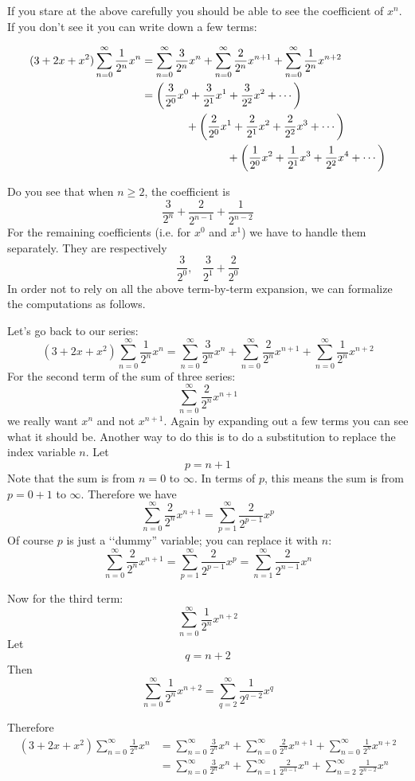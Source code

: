 If you stare at the above carefully you should be able to
see the coefficient of $x^n$.
If you don't see it you can write down a few terms:

\begin{align*}
(3 + 2x + x^2) \sum_{n = 0}^\infty \frac{1}{2^n}x^n
&= \sum_{n = 0}^\infty \frac{3}{2^n}x^n
+ \sum_{n = 0}^\infty \frac{2}{2^n}x^{n+1}
+ \sum_{n = 0}^\infty \frac{1}{2^n}x^{n+2} \\
&=
\biggl( \frac{3}{2^0}x^0 + \frac{3}{2^1}x^1 + \frac{3}{2^2}x^2 + \cdots \biggr) \\ 
&\hskip 1.4cm + \biggl( \frac{2}{2^0}x^1 + \frac{2}{2^1}x^2 + \frac{2}{2^2}x^3 + \cdots \biggr) \\
&\hskip 2.7cm + \biggl( \frac{1}{2^0}x^2 + \frac{1}{2^1}x^3 + \frac{1}{2^2}x^4 + \cdots \biggr)
\end{align*}

Do you see that when $n \geq 2$, the coefficient is
\[
\frac{3}{2^n} + \frac{2}{2^{n-1}} + \frac{1}{2^{n-2}}
\]
For the remaining coefficients (i.e. for $x^0$ and $x^1$) we have to 
handle them separately. They are respectively
\[
\frac{3}{2^0}, \,\,\,\,\, \frac{3}{2^1} + \frac{2}{2^0}
\] 
In order not to rely on all the above term-by-term expansion, we
can formalize the computations as follows.

Let's go back to our series:
\[
(3 + 2x + x^2) \sum_{n = 0}^\infty \frac{1}{2^n}x^n
= \sum_{n = 0}^\infty \frac{3}{2^n}x^n
+ \sum_{n = 0}^\infty \frac{2}{2^n}x^{n+1}
+ \sum_{n = 0}^\infty \frac{1}{2^n}x^{n+2}
\]
For the second term of the sum of three series:
\[
\sum_{n = 0}^\infty \frac{2}{2^n}x^{n+1}
\]
we really want $x^n$ and not $x^{n+1}$.
Again by expanding out a few terms you can see what it should be.
Another way to do this is to do a substitution to replace the
index variable $n$.
Let
\[
p = n + 1
\]
Note that the sum is from $n = 0$ to $\infty$.
In terms of $p$, this means the sum is from $p = 0 + 1$ to $\infty$.
Therefore we have
\[
\sum_{n = 0}^\infty \frac{2}{2^n}x^{n+1}
=
\sum_{p = 1}^\infty \frac{2}{2^{p-1}}x^{p}
\]
Of course $p$ is just a \lq\lq dummy'' variable; you can replace it with $n$:
\[
\sum_{n = 0}^\infty \frac{2}{2^n}x^{n+1}
=
\sum_{p = 1}^\infty \frac{2}{2^{p-1}}x^{p}
= 
\sum_{n = 1}^\infty \frac{2}{2^{n-1}}x^{n}
\]

Now for the third term:
\[
\sum_{n = 0}^\infty \frac{1}{2^n}x^{n+2}
\]
Let
\[
q = n + 2
\]
Then
\[
\sum_{n = 0}^\infty \frac{1}{2^n}x^{n+2}
=
\sum_{q = 2}^\infty \frac{1}{2^{q-2}}x^{q}
\]

Therefore
\begin{align*}
(3 + 2x + x^2) \sum_{n = 0}^\infty \frac{1}{2^n}x^n
&= \sum_{n = 0}^\infty \frac{3}{2^n}x^n
+ \sum_{n = 0}^\infty \frac{2}{2^n}x^{n+1}
+ \sum_{n = 0}^\infty \frac{1}{2^n}x^{n+2} \\
&=
\sum_{n = 0}^\infty \frac{3}{2^n}x^n
+ \sum_{n = 1}^\infty \frac{2}{2^{n-1}}x^{n}
+ \sum_{n = 2}^\infty \frac{1}{2^{n-2}}x^{n} \\
\end{align*}

